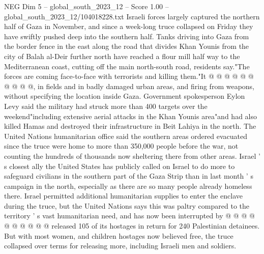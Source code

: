 \begin{textsample}{NEG Dim 5 – global\_south\_2023\_12 – Score 1.00 – global\_south\_2023\_12/104018228.txt}
Israeli forces largely captured the northern half of Gaza in November, and since a week-long truce collapsed on Friday they have swiftly pushed deep into the southern half.
Tanks driving into Gaza from the border fence in the east along the road that divides Khan Younis from the city of Balah al-Deir further north have reached a flour mill half way to the Mediterranean coast, cutting off the main north-south road, residents say."The forces are coming face-to-face with terrorists and killing them."It @ @ @ @ @ @ @ @ @ @, in fields and in badly damaged urban areas, and firing from weapons, without specifying the location inside Gaza.
Government spokesperson Eylon Levy said the military had struck more than 400 targets over the weekend"including extensive aerial attacks in the Khan Younis area"and had also killed Hamas and destroyed their infrastructure in Beit Lahiya in the north.
The United Nations humanitarian office said the southern areas ordered evacuated since the truce were home to more than 350,000 people before the war, not counting the hundreds of thousands now sheltering there from other areas.
Israel ' s closest ally the United States has publicly called on Israel to do more to safeguard civilians in the southern part of the Gaza Strip than in last month ' s campaign in the north, especially as there are so many people already homeless there.
Israel permitted additional humanitarian supplies to enter the enclave during the truce, but the United Nations says this was paltry compared to the territory ' s vast humanitarian need, and has now been interrupted by @ @ @ @ @ @ @ @ @ @ released 105 of its hostages in return for 240 Palestinian detainees.
But with most women, and children hostages now believed free, the truce collapsed over terms for releasing more, including Israeli men and soldiers.

\end{textsample}
